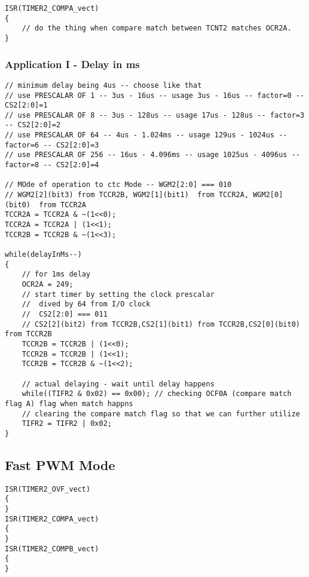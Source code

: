 \begin{verbatim}
ISR(TIMER2_COMPA_vect)
{
    // do the thing when compare match between TCNT2 matches OCR2A.
}
\end{verbatim}



\subsubsection{Application I - Delay in ms}

\begin{verbatim}
// minimum delay being 4us -- choose like that
// use PRESCALAR OF 1 -- 3us - 16us -- usage 3us - 16us -- factor=0 -- CS2[2:0]=1
// use PRESCALAR OF 8 -- 3us - 128us -- usage 17us - 128us -- factor=3 -- CS2[2:0]=2
// use PRESCALAR OF 64 -- 4us - 1.024ms -- usage 129us - 1024us -- factor=6 -- CS2[2:0]=3
// use PRESCALAR OF 256 -- 16us - 4.096ms -- usage 1025us - 4096us -- factor=8 -- CS2[2:0]=4
    
// MOde of operation to ctc Mode -- WGM2[2:0] === 010
// WGM2[2](bit3) from TCCR2B, WGM2[1](bit1)  from TCCR2A, WGM2[0](bit0)  from TCCR2A
TCCR2A = TCCR2A & ~(1<<0);
TCCR2A = TCCR2A | (1<<1);
TCCR2B = TCCR2B & ~(1<<3);

while(delayInMs--)
{
    // for 1ms delay
    OCR2A = 249;
    // start timer by setting the clock prescalar
    //  dived by 64 from I/O clock
    //  CS2[2:0] === 011
    // CS2[2](bit2) from TCCR2B,CS2[1](bit1) from TCCR2B,CS2[0](bit0) from TCCR2B
    TCCR2B = TCCR2B | (1<<0);
    TCCR2B = TCCR2B | (1<<1);
    TCCR2B = TCCR2B & ~(1<<2);

    // actual delaying - wait until delay happens
    while((TIFR2 & 0x02) == 0x00); // checking OCF0A (compare match flag A) flag when match happns
    // clearing the compare match flag so that we can further utilize
    TIFR2 = TIFR2 | 0x02;
}
\end{verbatim}

\subsection{Fast PWM Mode}
\begin{verbatim}
ISR(TIMER2_OVF_vect)
{
} 
ISR(TIMER2_COMPA_vect)
{
}
ISR(TIMER2_COMPB_vect)
{
}
\end{verbatim}
